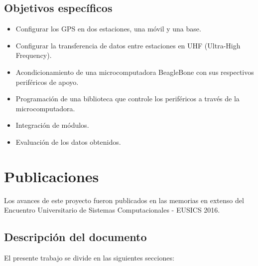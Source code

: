 \subsection{Objetivos específicos}
\begin{itemize}
	\item Configurar los GPS en dos estaciones, una móvil y una base.
    \item Configurar la transferencia de datos entre estaciones en UHF (Ultra-High Frequency\footnotemark).
    \item Acondicionamiento de una microcomputadora BeagleBone con sus respectivos periféricos de apoyo.
    \item Programación de una biblioteca que controle los periféricos a través de la microcomputadora.
    \item Integración de módulos.
	\item Evaluación de los datos obtenidos.   
\end{itemize}


\section{Publicaciones}

Los avances de este proyecto fueron publicados en las memorias en extenso del Encuentro Universitario de Sistemas Computacionales - EUSICS 2016.

\subsection{Descripción del documento}

El presente trabajo se divide en las siguientes secciones: 

